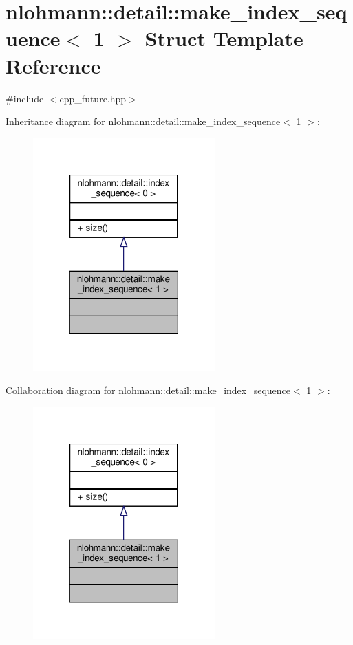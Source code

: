 \hypertarget{structnlohmann_1_1detail_1_1make__index__sequence_3_011_01_4}{}\section{nlohmann\+:\+:detail\+:\+:make\+\_\+index\+\_\+sequence$<$ 1 $>$ Struct Template Reference}
\label{structnlohmann_1_1detail_1_1make__index__sequence_3_011_01_4}


{\ttfamily \#include $<$cpp\+\_\+future.\+hpp$>$}



Inheritance diagram for nlohmann\+:\+:detail\+:\+:make\+\_\+index\+\_\+sequence$<$ 1 $>$\+:
\nopagebreak
\begin{figure}[H]
\begin{center}
\leavevmode
\includegraphics[width=198pt]{structnlohmann_1_1detail_1_1make__index__sequence_3_011_01_4__inherit__graph}
\end{center}
\end{figure}


Collaboration diagram for nlohmann\+:\+:detail\+:\+:make\+\_\+index\+\_\+sequence$<$ 1 $>$\+:
\nopagebreak
\begin{figure}[H]
\begin{center}
\leavevmode
\includegraphics[width=198pt]{structnlohmann_1_1detail_1_1make__index__sequence_3_011_01_4__coll__graph}
\end{center}
\end{figure}
